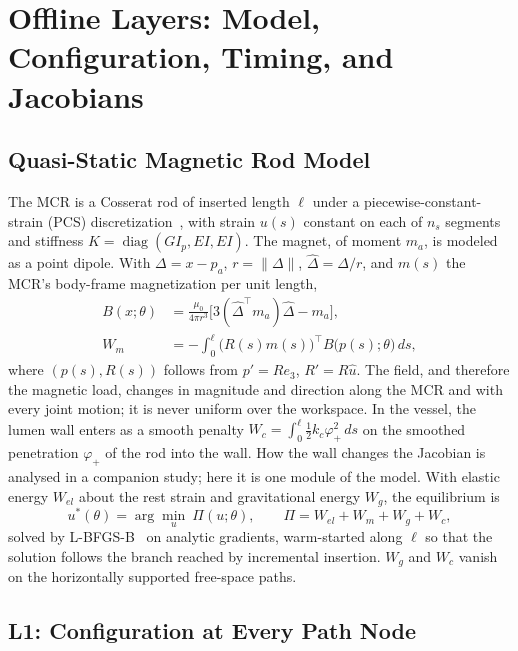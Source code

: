 \documentclass[journal]{IEEEtran}
\begin{document}
\section{Offline Layers: Model, Configuration, Timing, and Jacobians}
\label{sec:offline}

\subsection{Quasi-Static Magnetic Rod Model}
\label{sec:model}

The MCR is a Cosserat rod of inserted length $\ell$ under a
piecewise-constant-strain (PCS) discretization~\cite{renda2018discrete},
with strain $u(s)$ constant on each of $n_s$ segments and stiffness
$K=\operatorname{diag}(GI_p,EI,EI)$. The magnet, of moment $m_a$, is
modeled as a point dipole. With $\Delta=x-p_a$, $r=\lVert\Delta\rVert$,
$\hat\Delta=\Delta/r$, and $m(s)$ the MCR's body-frame magnetization per
unit length,
\begin{align}
B(x;\theta)&=\frac{\mu_0}{4\pi r^3}\big[3(\hat\Delta^\top m_a)\hat\Delta-m_a\big],
\label{eq:dipole}\\
W_m&=-\int_0^\ell\big(R(s)m(s)\big)^{\!\top}B\big(p(s);\theta\big)\,ds,
\label{eq:wm}
\end{align}
where $(p(s),R(s))$ follows from $p'=Re_3$, $R'=R\hat u$. The field, and
therefore the magnetic load, changes in magnitude and direction along the
MCR and with every joint motion; it is never uniform over the workspace.
In the vessel, the lumen wall enters as a smooth penalty
$W_c=\int_0^\ell\frac12k_c\varphi_+^2\,ds$ on the smoothed penetration
$\varphi_+$ of the rod into the wall. How the wall changes the Jacobian is
analysed in a companion study; here it is one module of the model. With
elastic energy $W_{el}$ about the rest strain and gravitational energy
$W_g$, the equilibrium is
\begin{equation}
u^*(\theta)=\arg\min_u\ \Pi(u;\theta),\qquad
\Pi=W_{el}+W_m+W_g+W_c,
\label{eq:equilibrium}
\end{equation}
solved by L-BFGS-B~\cite{byrd1995lbfgsb} on analytic gradients,
warm-started along $\ell$ so that the solution follows the branch reached by
incremental insertion. $W_g$ and $W_c$ vanish on the horizontally
supported free-space paths.

\subsection{L1: Configuration at Every Path Node}
\label{sec:l1}
\end{document}
